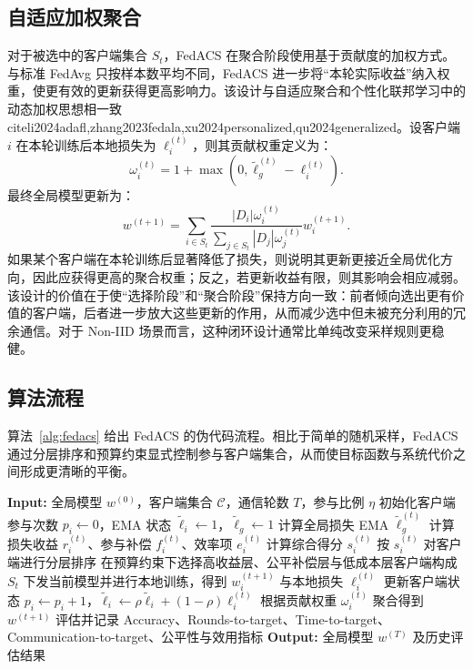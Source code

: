 \documentclass[UTF8,11pt]{ctexart}
\begin{document}
\subsection{自适应加权聚合}
对于被选中的客户端集合 $S_t$，FedACS 在聚合阶段使用基于贡献度的加权方式。与标准 FedAvg 只按样本数平均不同，FedACS 进一步将“本轮实际收益”纳入权重，使更有效的更新获得更高影响力。该设计与自适应聚合和个性化联邦学习中的动态加权思想相一致\\cite{li2024adafl,zhang2023fedala,xu2024personalized,qu2024generalized}。设客户端 $i$ 在本轮训练后本地损失为 $\ell_i^{(t)}$，则其贡献权重定义为：
\begin{equation}
\omega_i^{(t)} = 1 + \max(0,\tilde{\ell}_g^{(t)}-\ell_i^{(t)}).
\end{equation}
最终全局模型更新为：
\begin{equation}
 w^{(t+1)} = \sum_{i\in S_t}\frac{|D_i|\omega_i^{(t)}}{\sum_{j\in S_t}|D_j|\omega_j^{(t)}}w_i^{(t+1)}.
\end{equation}
如果某个客户端在本轮训练后显著降低了损失，则说明其更新更接近全局优化方向，因此应获得更高的聚合权重；反之，若更新收益有限，则其影响会相应减弱。该设计的价值在于使“选择阶段”和“聚合阶段”保持方向一致：前者倾向选出更有价值的客户端，后者进一步放大这些更新的作用，从而减少选中但未被充分利用的冗余通信。对于 Non-IID 场景而言，这种闭环设计通常比单纯改变采样规则更稳健。

\subsection{算法流程}
算法~\ref{alg:fedacs} 给出 FedACS 的伪代码流程。相比于简单的随机采样，FedACS 通过分层排序和预算约束显式控制参与客户端集合，从而使目标函数与系统代价之间形成更清晰的平衡。

\begin{algorithm}[H]
\caption{FedACS}
\label{alg:fedacs}
\begin{algorithmic}[1]
\STATE \textbf{Input:} 全局模型 $w^{(0)}$，客户端集合 $\mathcal{C}$，通信轮数 $T$，参与比例 $\eta$
\STATE 初始化客户端参与次数 $p_i \leftarrow 0$，EMA 状态 $\tilde{\ell}_i \leftarrow 1$，$\tilde{\ell}_g \leftarrow 1$
    \STATE 计算全局损失 EMA $\tilde{\ell}_g^{(t)}$
        \STATE 计算损失收益 $r_i^{(t)}$、参与补偿 $f_i^{(t)}$、效率项 $e_i^{(t)}$
        \STATE 计算综合得分 $s_i^{(t)}$
    \ENDFOR
    \STATE 按 $s_i^{(t)}$ 对客户端进行分层排序
    \STATE 在预算约束下选择高收益层、公平补偿层与低成本层客户端构成 $S_t$
        \STATE 下发当前模型并进行本地训练，得到 $w_i^{(t+1)}$ 与本地损失 $\ell_i^{(t)}$
        \STATE 更新客户端状态 $p_i \leftarrow p_i + 1$，$\tilde{\ell}_i \leftarrow \rho\tilde{\ell}_i+(1-\rho)\ell_i^{(t)}$
    \ENDFOR
    \STATE 根据贡献权重 $\omega_i^{(t)}$ 聚合得到 $w^{(t+1)}$
    \STATE 评估并记录 Accuracy、Rounds-to-target、Time-to-target、Communication-to-target、公平性与效用指标
\ENDFOR
\STATE \textbf{Output:} 全局模型 $w^{(T)}$ 及历史评估结果
\end{algorithmic}
\end{algorithm}
\end{document}
